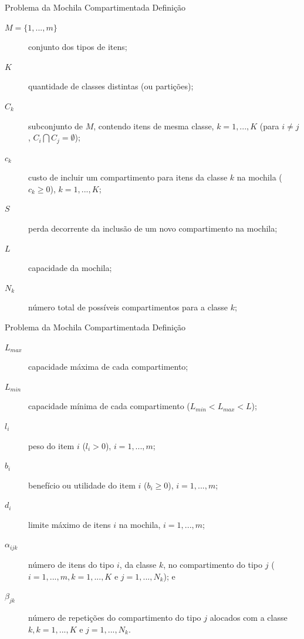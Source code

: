 \documentclass[slidestop,compress,mathserif]{beamer}
\begin{document}
\begin{frame} {Problema da Mochila Compartimentada} {Definição}

\begin{description}
	\item[$M=\{1,...,m\}$] conjunto dos tipos de itens;
	\item[$K$] quantidade de classes distintas (ou partições);
	\item[$C_k$] subconjunto de $M$, contendo itens de mesma classe, $k=1,...,K$ (para $i \neq j$, $C_i  \bigcap C_j = \emptyset$);
	\item[$c_k$] custo de incluir um compartimento para itens da classe $k$ na mochila ($c_{k} \geq 0$), $k = 1, ..., K$;
	\item[$S$] perda decorrente da inclusão de um novo compartimento na mochila;
	\item[$L$] capacidade da mochila;
	\item[$N_k$] número total de possíveis compartimentos para a classe $k$;
\end{description}

\end{frame}


\begin{frame} {Problema da Mochila Compartimentada} {Definição}

\begin{description}
	\item[$L_{max}$] capacidade máxima de cada compartimento;
	\item[$L_{min}$] capacidade mínima de cada compartimento ($L_{min} < L_{max} < L$);
	\item[$l_i$] peso do item $i$ ($l_i >0$), $i = 1, ..., m$; 
	\item[$b_i$] benefício ou utilidade do item $i$ ($b_i \geq 0$), $i=1,...,m$;
	\item[$d_i$] limite máximo de itens $i$ na mochila, $i = 1, ..., m$;
	\item[$\alpha_{ijk}$] número de itens do tipo $i$, da classe $k$, no compartimento do tipo $j$ ($i = 1, ..., m, k = 1, ..., K$ e $j = 1, ..., N_{k}$); e
	\item[$\beta_{jk}$] número de repetições do compartimento do tipo $j$ alocados com a classe $k, k = 1, ..., K$ e $j = 1, ..., N_{k}$.
\end{description}

\end{frame}
\end{document}
